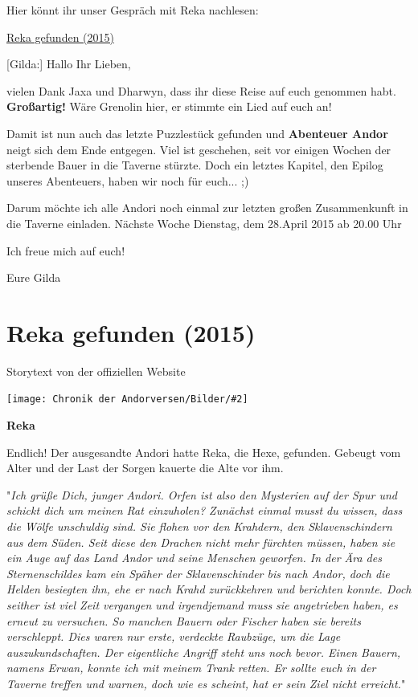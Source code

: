 \documentclass[10pt, a4paper, oneside]{book}
\newcommand{\fillbreak}{\vspace*{\fill}\columnbreak}
\newcommand{\storytext}[1]{%
    \section{#1}%
    \label{Storytext: #1}%
}
\newcommand{\refstorytext}[1]{\hyperref[Storytext: #1]{#1}}
\newcommand{\bildmitts}[2][height=0.32\textwidth,width=0.48\textwidth,keepaspectratio]{%
    \begin{center}
        \texttt{[image: Chronik der Andorversen/Bilder/\#2]}
    \end{center}
}
\begin{document}
\begin{multicols}{2}
Hier könnt ihr unser Gespräch mit Reka nachlesen:

\refstorytext{Reka gefunden (2015)}

[Gilda:] Hallo Ihr Lieben,

vielen Dank Jaxa und Dharwyn, dass ihr diese Reise auf euch genommen habt. \textbf{Großartig!} Wäre Grenolin hier, er stimmte ein Lied auf euch an!

Damit ist nun auch das letzte Puzzlestück gefunden und \textbf{Abenteuer Andor} neigt sich dem Ende entgegen. Viel ist geschehen, seit vor einigen Wochen der sterbende Bauer in die Taverne stürzte. Doch ein letztes Kapitel, den Epilog unseres Abenteuers, haben wir noch für euch... ;)

Darum möchte ich alle Andori noch einmal zur letzten großen Zusammenkunft in die Taverne einladen. Nächste Woche Dienstag, dem 28.April 2015 ab 20.00 Uhr


Ich freue mich auf euch!

Eure Gilda





\fillbreak
\storytext{Reka gefunden (2015)}

\begin{center}
    Storytext von der offiziellen Website
\end{center}

\bildmitts{Reka gefunden Bild 1.jpg}

\textbf{Reka}

Endlich! Der ausgesandte Andori hatte Reka, die Hexe, gefunden. Gebeugt vom Alter und der Last der Sorgen kauerte die Alte vor ihm.\bigskip

"\textit{Ich grüße Dich, junger Andori. Orfen ist also den Mysterien auf der Spur und schickt dich um meinen Rat einzuholen? Zunächst einmal musst du wissen, dass die Wölfe unschuldig sind. Sie flohen vor den Krahdern, den Sklavenschindern aus dem Süden. Seit diese den Drachen nicht mehr fürchten müssen, haben sie ein Auge auf das Land Andor und seine Menschen geworfen. In der Ära des Sternenschildes kam ein Späher der Sklavenschinder bis nach Andor, doch die Helden besiegten ihn, ehe er nach Krahd zurückkehren und berichten konnte. Doch seither ist viel Zeit vergangen und irgendjemand muss sie angetrieben haben, es erneut zu versuchen. So manchen Bauern oder Fischer haben sie bereits verschleppt. Dies waren nur erste, verdeckte Raubzüge, um die Lage auszukundschaften. Der eigentliche Angriff steht uns noch bevor. Einen Bauern, namens Erwan, konnte ich mit meinem Trank retten. Er sollte euch in der Taverne treffen und warnen, doch wie es scheint, hat er sein Ziel nicht erreicht.}"\bigskip


\end{multicols}
\end{document}

